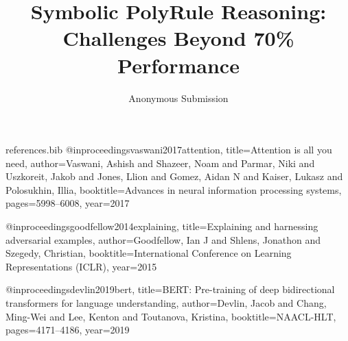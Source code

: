 \begin{filecontents}{references.bib}
@inproceedings{vaswani2017attention,
  title={Attention is all you need},
  author={Vaswani, Ashish and Shazeer, Noam and Parmar, Niki and Uszkoreit, Jakob and Jones, Llion and Gomez, Aidan N and Kaiser, Lukasz and Polosukhin, Illia},
  booktitle={Advances in neural information processing systems},
  pages={5998--6008},
  year={2017}
}

@inproceedings{goodfellow2014explaining,
  title={Explaining and harnessing adversarial examples},
  author={Goodfellow, Ian J and Shlens, Jonathon and Szegedy, Christian},
  booktitle={International Conference on Learning Representations (ICLR)},
  year={2015}
}

@inproceedings{devlin2019bert,
  title={BERT: Pre-training of deep bidirectional transformers for language understanding},
  author={Devlin, Jacob and Chang, Ming-Wei and Lee, Kenton and Toutanova, Kristina},
  booktitle={NAACL-HLT},
  pages={4171--4186},
  year={2019}
}
\end{filecontents}

\documentclass{article}

\usepackage[margin=1in]{geometry}
\usepackage{graphicx}
\usepackage{subcaption}
\usepackage{amsmath,amssymb}
\usepackage[numbers]{natbib}
\usepackage{times}

\graphicspath{{figures/}}

\title{Symbolic PolyRule Reasoning:\\Challenges Beyond 70\% Performance}

\author{Anonymous Submission}
\date{}


\maketitle

\begin{abstract}
We investigate Symbolic PolyRule Reasoning tasks and expose unexpected failure modes in neural architectures. Our empirical findings highlight the challenges in surpassing a persistent performance plateau, underscoring critical pitfalls for real-world application.
\end{abstract}

\section{Introduction}
Deep neural models often excel at large-scale data tasks. However, symbolic or rule-based reasoning remains surprisingly elusive. In this study, we explore Transformer-based methods and baseline sequence models for a PolyRule triage task. Despite high expressiveness, these approaches plateau around 70\% macro-F1. We analyze overfitting, interventions involving dropout, and hyperparameter tuning to show how these models struggle with rule-based domain nuances. Our contribution is a careful presentation of partial improvements, revealing where results remain firmly below practical thresholds.

